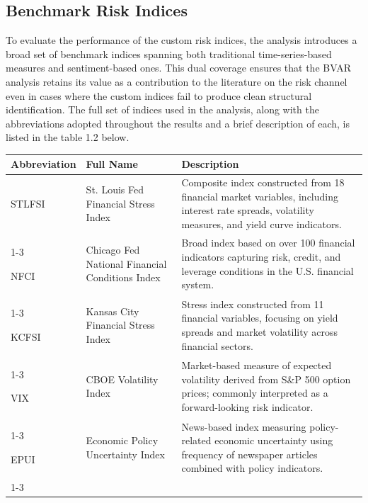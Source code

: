 \documentclass[12pt,a4paper]{report}\usepackage[a4paper, top=2.5cm, bottom=2.5cm, left=2.5cm, right=2.5cm]{geometry}
\begin{document}
\subsection{Benchmark Risk Indices}

To evaluate the performance of the custom risk indices, the analysis introduces a broad set of benchmark indices spanning both traditional time-series-based measures and sentiment-based ones. This dual coverage ensures that the BVAR analysis retains its value as a contribution to the literature on the risk channel even in cases where the custom indices fail to produce clean structural identification. The full set of indices used in the analysis, along with the abbreviations adopted throughout the results and a brief description of each, is listed in the table 1.2 below.
\begin{table}[H]
\centering
\label{tab:risk_indices}

\vspace{0.3cm}
\renewcommand{\arraystretch}{1.4}

\begin{tabularx}{\textwidth}{p{2.5cm} p{6.5cm} X}
\hline
\textbf{Abbreviation} & \textbf{Full Name} & \textbf{Description} \\
\hline

STLFSI & St. Louis Fed Financial Stress Index 
& Composite index constructed from 18 financial market variables, including interest rate spreads, volatility measures, and yield curve indicators. \\
\cline{1-3}

NFCI & Chicago Fed National Financial Conditions Index 
& Broad index based on over 100 financial indicators capturing risk, credit, and leverage conditions in the U.S. financial system. \\
\cline{1-3}

KCFSI & Kansas City Financial Stress Index 
& Stress index constructed from 11 financial variables, focusing on yield spreads and market volatility across financial sectors. \\
\cline{1-3}

VIX & CBOE Volatility Index 
& Market-based measure of expected volatility derived from S\&P 500 option prices; commonly interpreted as a forward-looking risk indicator. \\
\cline{1-3}

EPUI & Economic Policy Uncertainty Index 
& News-based index measuring policy-related economic uncertainty using frequency of newspaper articles combined with policy indicators. \\
\cline{1-3}


\end{tabularx}
\end{table}
\end{document}
